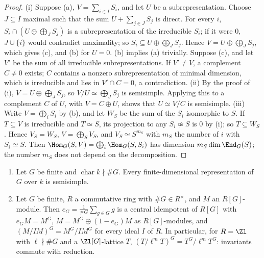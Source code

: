 \begin{proof}
(i) Suppose (a), $V=\sum_{i\in I}S_i$, and let $U$ be a subrepresentation. Choose $J\subseteq I$ maximal such that the sum $U+\sum_{j\in J}S_j$ is
direct. For every $i$, $S_i\cap(U\oplus\bigoplus_JS_j)$ is a subrepresentation of the irreducible $S_i$; if it were $0$, $J\cup\{i\}$ would
contradict maximality; so $S_i\subseteq U\oplus\bigoplus_JS_j$. Hence $V=U\oplus\bigoplus_JS_j$, which gives (c), and (b) for $U=0$. (b) implies (a)
trivially. Suppose (c), and let $V'$ be the sum of all irreducible subrepresentations. If $V'\ne V$, a complement $C\ne0$ exists; $C$
contains a nonzero subrepresentation of minimal dimension, which is irreducible and lies in $V'\cap C=0$, a contradiction.
(ii) By the proof of (i), $V=U\oplus\bigoplus_JS_j$, so $V/U\simeq\bigoplus_JS_j$ is semisimple. Applying this to a complement $C$ of $U$, with
$V=C\oplus U$, shows that $U\simeq V/C$ is semisimple.
(iii) Write $V=\bigoplus_iS_i$ by (b), and let $W_S$ be the sum of the $S_i$ isomorphic to $S$. If $T\subseteq V$ is irreducible and $T\simeq S$, its
projection to any $S_i\not\simeq S$ is $0$ by (i); so $T\subseteq W_S$. Hence $V_S=W_S$, $V=\bigoplus_SV_S$, and $V_S\simeq S^{m_S}$ with $m_S$
the number of $i$ with $S_i\simeq S$. Then $\Hom_G(S,V)=\bigoplus_i\Hom_G(S,S_i)$ has dimension $m_S\dim\End_G(S)$; the number $m_S$ does not
depend on the decomposition.
\end{proof}

\begin{theorem}[Maschke]\label{thm:reps:maschke}
\begin{enumerate}[label=(\roman*)]
\item Let $G$ be finite and $\operatorname{char}k\nmid\#G$. Every finite-dimensional representation of $G$ over $k$ is semisimple.
\item Let $G$ be finite, $R$ a commutative ring with $\#G\in R^\times$, and $M$ an $R[G]$-module. Then $e_G=\frac1{\#G}\sum_{g\in G}g$ is a central idempotent of
$R[G]$ with $e_GM=M^G$, $M=M^G\oplus(1-e_G)M$ as $R[G]$-modules, and $(M/IM)^G=M^G/IM^G$ for every ideal $I$ of $R$. In particular, for $R=\Zl$
with $\ell\nmid\#G$ and a $\Zl[G]$-lattice $T$, $(T/\ell^mT)^G=T^G/\ell^mT^G$: invariants commute with reduction.
\end{enumerate}
\end{theorem}

